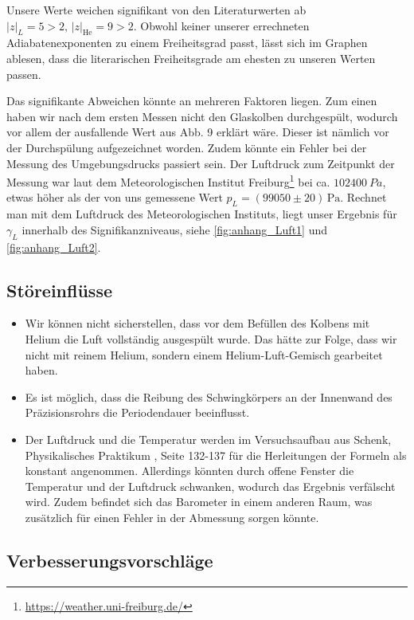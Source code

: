\documentclass[12pt,a4paper]{article}
\begin{document}
Unsere Werte weichen signifikant von den Literaturwerten ab $|z|_L=5>2,\, |z|_{\mathrm{He}}=9>2.$
Obwohl keiner unserer errechneten Adiabatenexponenten zu einem Freiheitsgrad passt, lässt sich im Graphen ablesen, dass die literarischen Freiheitsgrade am ehesten zu unseren Werten passen.

Das signifikante Abweichen könnte an mehreren Faktoren liegen. Zum einen haben wir nach dem ersten Messen nicht den Glaskolben durchgespült, wodurch vor allem der ausfallende Wert aus Abb. 9 erklärt wäre. Dieser ist nämlich vor der Durchspülung aufgezeichnet worden. Zudem könnte ein Fehler bei der Messung des Umgebungsdrucks passiert sein. Der Luftdruck zum Zeitpunkt der Messung war laut dem Meteorologischen Institut Freiburg\footnote{\url{https://weather.uni-freiburg.de/}} bei ca. $\SI{102400}{Pa}$, etwas höher als der von uns gemessene Wert
$
p_L=(99050\pm20)\,\si{\pascal}.
$
Rechnet man mit dem Luftdruck des Meteorologischen Instituts, liegt unser Ergebnis für $\gamma_L$ innerhalb des Signifikanzniveaus, siehe \cref{fig:anhang_Luft1} und \cref{fig:anhang_Luft2}.

\subsection{Störeinflüsse}

\begin{itemize}
    \item Wir können nicht sicherstellen, dass vor dem Befüllen des Kolbens mit Helium die Luft vollständig ausgespült wurde. Das hätte zur Folge, dass wir nicht mit reinem Helium, sondern einem Helium-Luft-Gemisch gearbeitet haben.
    \item Es ist möglich, dass die Reibung des Schwingkörpers an der Innenwand des Präzisionsrohrs die Periodendauer beeinflusst.
    \item Der Luftdruck und die Temperatur werden im Versuchsaufbau aus Schenk, Physikalisches Praktikum , Seite 132-137 für die Herleitungen der Formeln als konstant angenommen. Allerdings könnten durch offene Fenster die Temperatur und der Luftdruck schwanken, wodurch das Ergebnis verfälscht wird. Zudem befindet sich das Barometer in einem anderen Raum, was zusätzlich für einen Fehler in der Abmessung sorgen könnte.
\end{itemize}

\subsection{Verbesserungsvorschläge}
\end{document}

